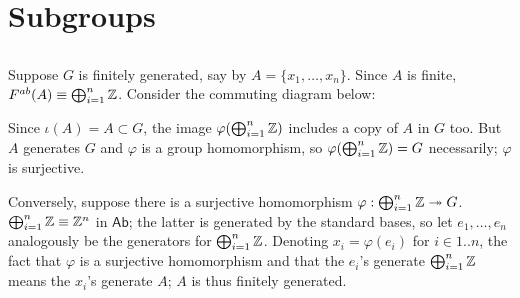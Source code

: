 \documentclass[12pt]{article}
\begin{document}
\section{Subgroups}
\setcounter{subsection}{7}
\subsection{}
Suppose $G$ is finitely generated, say by $A = \{x_1, \ldots, x_n\}$. 
Since $A$ is finite, $F^{ab}(A) \equiv \bigoplus_{i = 1}^{n} \Z$. 
Consider the commuting diagram below:
\begin{center}
\end{center}
Since $\iota(A) = A \subset G$, the image $\varphi(\bigoplus_{i = 1}^{n} \mathbb{Z})$ includes a copy of $A$ in $G$ too. 
But $A$ generates $G$ and $\varphi$ is a group homomorphism, so $\varphi(\bigoplus_{i = 1}^{n} \mathbb{Z}) = G$ necessarily; 
$\varphi$ is surjective. 

Conversely, suppose there is a surjective homomorphism $\varphi: \bigoplus_{i = 1}^{n} \mathbb{Z} \twoheadrightarrow G$. 
$\bigoplus_{i = 1}^{n} \Z \equiv \Z^{n}$ in $\textsf{Ab}$;
the latter is generated by the standard bases, so let $e_1, \ldots, e_n$ analogously be the generators for $\bigoplus_{i = 1}^{n} \mathbb{Z}$.  
Denoting $x_i = \varphi(e_i)$ for $i \in 1..n$, the fact that $\varphi$ is a surjective homomorphism and that the $e_i$'s generate $\bigoplus_{i = 1}^{n} \mathbb{Z}$ means the $x_i$'s generate $A$; 
$A$ is thus finitely generated. 

\setcounter{subsection}{9} 
\end{document}
